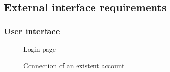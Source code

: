 \subsection{External interface requirements}
\subsubsection{User interface}
	
	\begin{figure}[!h]
	\centering
	\begin{minipage}[b]{0.65\textwidth}
			\caption{Login page}
		\end{minipage}
		\begin{minipage}[b]{0.65\textwidth}
			\caption{Connection of an existent account}
		\end{minipage}
	\end{figure}
